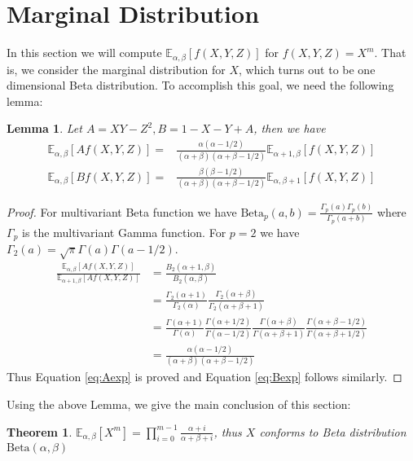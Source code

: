 \documentclass{elsarticle}
\def\E{\mathbb{E}}
\def\Beta{\textrm{Beta}}
\newtheorem{lemma}{Lemma}
\newtheorem{theorem}{Theorem}
\begin{document}
\section{Marginal Distribution}
In this section we will compute $\E_{\alpha,\beta}[f(X,Y, Z)]$
for $f(X,Y,Z)=X^m$. That is, we consider the marginal distribution for $X$,
which turns out to be one dimensional Beta distribution.
To accomplish this goal, we need the following lemma:
\begin{lemma}\label{lem:AB}
Let $A = XY - Z^2, B = 1 - X - Y + A$, then we have
\begin{align}
\E_{\alpha, \beta}[Af(X,Y,Z)] =&
\frac{\alpha(\alpha-1/2)}{(\alpha+\beta)(\alpha+\beta-1/2)}\E_{\alpha+1, \beta}[f(X,Y,Z)]
\label{eq:Aexp} \\
\E_{\alpha,\beta}[Bf(X,Y,Z)] =&
\frac{\beta(\beta-1/2)}{(\alpha+\beta)(\alpha+\beta-1/2)}\E_{\alpha, \beta+1}[f(X,Y,Z)]
\label{eq:Bexp}
\end{align}
\end{lemma}
\begin{proof}
For multivariant Beta function we have
$\Beta_p(a, b) = \frac{\Gamma_p(a)\Gamma_p(b)}{\Gamma_p(a+b)}$
where $\Gamma_p$ is the multivariant Gamma function.
For $p=2$ we have $\Gamma_2(a) = \sqrt{\pi}\Gamma(a)\Gamma(a-1/2)$.
\begin{align*}
\frac{\E_{\alpha, \beta}[Af(X,Y,Z)]}{\E_{\alpha+1, \beta}[Af(X,Y,Z)]} &
=\frac{B_2(\alpha+1,\beta)}{B_2(\alpha,\beta)}\\
&=\frac{\Gamma_2(\alpha+1)}{\Gamma_2(\alpha)}
\frac{\Gamma_2(\alpha+\beta)}{\Gamma_2(\alpha+\beta+1)}\\
& =\frac{\Gamma(\alpha+1)}{\Gamma(\alpha)}
\frac{\Gamma(\alpha+1/2)}{\Gamma(\alpha-1/2)}
\frac{\Gamma(\alpha+\beta)}{\Gamma(\alpha+\beta+1)}
\frac{\Gamma(\alpha+\beta-1/2)}{\Gamma(\alpha+\beta+1/2)}\\
&=\frac{\alpha(\alpha-1/2)}{(\alpha+\beta)(\alpha+\beta-1/2)}
\end{align*}
Thus Equation \eqref{eq:Aexp} is proved and Equation \eqref{eq:Bexp} follows similarly.
\end{proof}
Using the above Lemma, we give the main conclusion of this section:
\begin{theorem}\label{thm:Xm}
$\E_{\alpha, \beta}[X^m] =
\prod_{i=0}^{m-1}\frac{\alpha+i}{\alpha+\beta+i}$, thus $X$
conforms to Beta distribution $\Beta(\alpha, \beta)$
\end{theorem}
\end{document}
